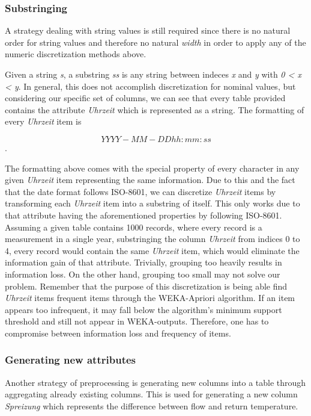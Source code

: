 \documentclass[bachelor,english]{info1thesis}
\begin{document}
\subsubsection{Substringing}
\label{sec:substringing}

A strategy dealing with string values is still required since there is no natural order for string values and therefore no natural \textit{width} in order to apply any of the numeric discretization methods above.

Given a string \textit{s}, a substring \textit{ss} is any string between indeces \textit{x} and \textit{y} with \textit{0 < x < y}. In general, this does not accomplish discretization for nominal values, but considering our specific set of columns, we can see that every table provided contains the attribute \textit{Uhrzeit} which is represented as a string. The formatting of every \textit{Uhrzeit} item is

\[YYYY-MM-DD hh:mm:ss\].

The formatting above comes with the special property of every character in any given \textit{Uhrzeit} item representing the same information. Due to this and the fact that the date format follows ISO-8601, we can discretize \textit{Uhrzeit} items by transforming each \textit{Uhrzeit} item into a substring of itself. This only works due to that attribute having the aforementioned properties by following ISO-8601.
Assuming a given table contains 1000 records, where every record is a measurement in a single year, substringing the column \textit{Uhrzeit} from indices 0 to 4, every record would contain the same \textit{Uhrzeit} item, which would eliminate the information gain of that attribute. Trivially, grouping too heavily results in information loss. On the other hand, grouping too small may not solve our problem. Remember that the purpose of this discretization is being able find \textit{Uhrzeit} items frequent items through the WEKA-Apriori algorithm. If an item appears too infrequent, it may fall below the algorithm's minimum support threshold and still not appear in WEKA-outputs. Therefore, one has to compromise between information loss and frequency of items.

\subsubsection{Generating new attributes}
\label{sec:newattributes}

Another strategy of preprocessing is generating new columns into a table through aggregating already existing columns. This is used for generating a new column \textit{Spreizung} which represents the difference between flow and return temperature.
\end{document}
